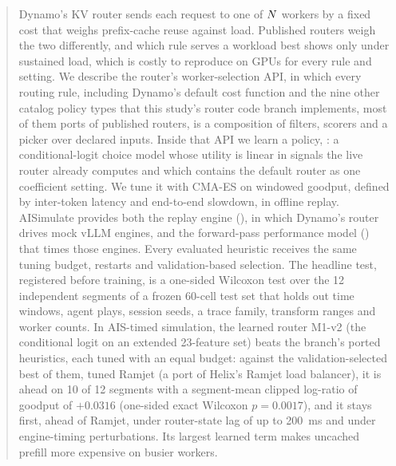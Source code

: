 \begin{abstract}
\noindent
Dynamo's KV router sends each request to one of $\Nw$ workers by a fixed cost that weighs
prefix-cache reuse against load. Published routers weigh the two differently, and which rule serves
a workload best shows only under sustained load, which is costly to reproduce on GPUs for every
rule and setting. We describe the router's worker-selection API, in which every routing rule,
including Dynamo's default cost function and the nine other catalog policy types that this study's
router code branch implements, most of them ports of published routers, is a composition of filters,
scorers and a picker over declared inputs. Inside that API we learn a policy, \lc{}: a
conditional-logit choice model whose utility is linear in signals the live router already computes
and which contains the default router as one coefficient setting. We tune it with CMA-ES on windowed
goodput, defined by inter-token latency and end-to-end slowdown, in offline replay. AISimulate
provides both the replay engine (\aisim{}), in which Dynamo's router drives mock vLLM engines, and the
forward-pass performance model (\ais{}) that times those engines.
Every evaluated heuristic receives the same tuning budget, restarts and validation-based
selection. The headline test, registered before training, is a one-sided Wilcoxon test over the 12
independent segments of a frozen 60-cell test set that holds out time windows, agent plays, session
seeds, a trace family, transform ranges and worker counts.
In AIS-timed simulation, the learned router M1-v2 (the conditional logit on an extended 23-feature
set) beats the branch's ported heuristics, each tuned with an equal budget: against the
validation-selected best of them, tuned Ramjet (a port of Helix's Ramjet load balancer), it is ahead
on 10 of 12 segments with a segment-mean clipped log-ratio of goodput of $+0.0316$ (one-sided exact
Wilcoxon $p = 0.0017$), and it stays first, ahead of Ramjet, under router-state lag of up to
\SI{200}{ms} and under engine-timing perturbations. Its largest learned term makes uncached prefill
more expensive on busier workers.

\end{abstract}
